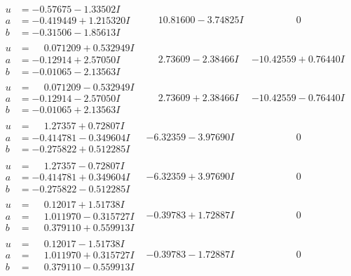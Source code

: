 \documentclass[1p]{elsarticle_modified}
\theoremstyle{definition}
\begin{document}
$$\begin{array}{c|c|c}
\begin{aligned}
u &= -0.57675 - 1.33502 I \\
a &= -0.419449 + 1.215320 I \\
b &= -0.31506 - 1.85613 I\end{aligned}
 & \phantom{-}10.81600 - 3.74825 I & \phantom{-0.000000 } 0 \\ \hline\begin{aligned}
u &= \phantom{-}0.071209 + 0.532949 I \\
a &= -0.12914 + 2.57050 I \\
b &= -0.01065 - 2.13563 I\end{aligned}
 & \phantom{-}2.73609 - 2.38466 I & -10.42559 + 0.76440 I \\ \hline\begin{aligned}
u &= \phantom{-}0.071209 - 0.532949 I \\
a &= -0.12914 - 2.57050 I \\
b &= -0.01065 + 2.13563 I\end{aligned}
 & \phantom{-}2.73609 + 2.38466 I & -10.42559 - 0.76440 I \\ \hline\begin{aligned}
u &= \phantom{-}1.27357 + 0.72807 I \\
a &= -0.414781 - 0.349604 I \\
b &= -0.275822 + 0.512285 I\end{aligned}
 & -6.32359 - 3.97690 I & \phantom{-0.000000 } 0 \\ \hline\begin{aligned}
u &= \phantom{-}1.27357 - 0.72807 I \\
a &= -0.414781 + 0.349604 I \\
b &= -0.275822 - 0.512285 I\end{aligned}
 & -6.32359 + 3.97690 I & \phantom{-0.000000 } 0 \\ \hline\begin{aligned}
u &= \phantom{-}0.12017 + 1.51738 I \\
a &= \phantom{-}1.011970 - 0.315727 I \\
b &= \phantom{-}0.379110 + 0.559913 I\end{aligned}
 & -0.39783 + 1.72887 I & \phantom{-0.000000 } 0 \\ \hline\begin{aligned}
u &= \phantom{-}0.12017 - 1.51738 I \\
a &= \phantom{-}1.011970 + 0.315727 I \\
b &= \phantom{-}0.379110 - 0.559913 I\end{aligned}
 & -0.39783 - 1.72887 I & \phantom{-0.000000 } 0 \\ \hline\begin{aligned}

\end{aligned}
\end{array}$$
\end{document}
